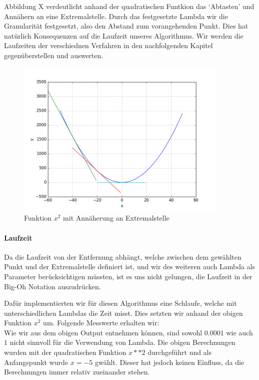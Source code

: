 \documentclass[10pt]{article}         %
\begin{document}
Abbildung X verdeutlicht anhand der quadratischen Funtkion das `Abtasten' und Annähern an eine Extremalstelle. Durch das festgesetzte Lambda wir die Granularität festgesetzt, also den Abstand zum vorangehenden Punkt. Dies hat natürlich Konsequenzen auf die Laufzeit unseres Algorithmus. Wir werden die Laufzeiten der verschiednen Verfahren in den nachfolgenden Kapitel gegenüberstellen und auswerten. 

\begin{figure}[!ht]
    \centering
    \includegraphics[width=0.9\textwidth]{gradient}
    \caption{Funktion $x^2$ mit Annäherung an Extremalstelle}\label{gradientx}
\end{figure}

\paragraph{Laufzeit}
Da die Laufzeit von der Entfernung abhängt, welche zwischen dem gewählten Punkt und der Extremalstelle definiert ist, und wir des weiteren auch Lambda als Parameter berücksichtigen müssten, ist es uns nicht gelungen, die Laufzeit in der Big-Oh Notation auszudrücken.

Dafür implementierten wir für diesen Algorithmus eine Schlaufe, welche mit unterschiedlichen Lambdas die Zeit misst. Dies setzten wir anhand der obigen Funktion $x^2$ um. Folgende Messwerte erhalten wir:\\




Wie wir aus dem obigen Output entnehmen können, sind sowohl $0.0001$ wie auch $1$ nicht sinnvoll für die Verwendung von Lambda. Die obigen Berechnungen wurden mit der quadratischen Funktion $x**2$ durchgeführt und als Anfangspunkt wurde $x=-5$ gwählt. Dieser hat jedoch keinen Einfluss, da die Berechnungen immer relativ zueinander stehen. 
\end{document}
